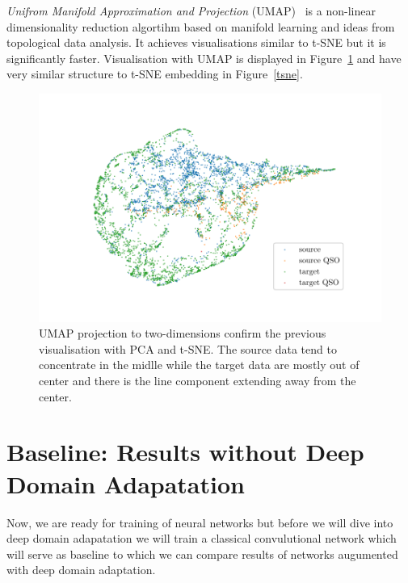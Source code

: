 \textit{Unifrom Manifold Approximation and Projection} (UMAP)~\cite{mcinnes2018}
is a non-linear dimensionality reduction algortihm based on manifold learning and ideas from topological data analysis.
It achieves visualisations similar to t-SNE but it is significantly faster.
Visualisation with UMAP is displayed in Figure~\ref{umap}
and have very similar structure to t-SNE embedding in Figure~\ref{tsne}.

\begin{figure}
\includegraphics[width=\textwidth]{img/umap.pdf}
\caption[UMAP visualisation of source and target data distributions]{
	UMAP projection to two-dimensions confirm the previous visualisation
	with PCA and t-SNE.
	The source data tend to concentrate in the midlle
	while the target data are mostly out of center
	and there is the line component extending away from the center.
	}
\label{umap}
\end{figure}

\section{Baseline: Results without Deep Domain Adapatation}
\label{baseline}

Now, we are ready for training of neural networks
but before we will dive into deep domain adapatation
we will train a classical convulutional network
which will serve as baseline to
which we can compare results of networks augumented with deep domain adaptation.

